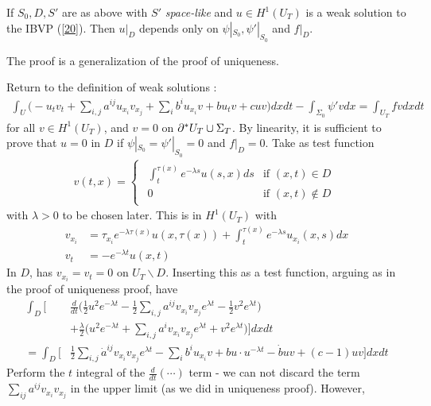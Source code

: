 \documentclass[12pt,a4paper]{report}
\newenvironment{proof}
{\begin{changemargin}{1cm}{0.5cm} 
	}%
	{\end{changemargin}
}
\begin{document}
\thm If $S_0, D, S'$ are as above with $S'$ \emph{space-like} and $u\in H^1(U_T)$ is a weak solution to the IBVP (\ref{20}). Then $u|_D$ depends only on $\psi|_{S_0}, \psi'|_{S_0}$ and $f|_D$. 
\begin{proof}
\pf The proof is a generalization of the proof of uniqueness.

\quad Return to the definition of weak solutions :
\begin{align*}
\int_U \Big(-u_t v_t + \sum_{i,j} a^{ij} u_{x_i} v_{x_j} + \sum_{i}b^i u_{x_i} v + bu_t v + cuv \Big) dxdt - \int_{\Sigma_0} \psi' v dx = \int_{U_T} fv dxdt
\end{align*}
for all $v\in H^1(U_T)$, and $v=0$ on $\partial^* U_T \cup \Sigma_T$. By linearity, it is sufficient to prove that $u=0$ in $D$ if $\psi|_{S_0} = \psi'|_{S_0}=0$ and $f|_D =0$. Take as test function
\begin{align*}
v(t,x) = \begin{cases}
\begin{array}{ll}
\int^{\tau(x)}_t e^{-\lambda s} u(s,x) ds & \text{if } (x,t) \in D \\
0 & \text{if } (x,t) \not\in D
\end{array}
\end{cases}
\end{align*}
with $\lambda >0$ to be chosen later. This is in $H^1(U_T)$ with
\begin{align*}
v_{x_i} &= \tau_{x_i} e^{-\lambda \tau(x)} u(x, \tau(x)) + \int_t^{\tau(x)} e^{-\lambda s} u_{x_i}(x,s) dx \\
v_t &= -e^{-\lambda t} u(x,t)
\end{align*}
In $D$, has $v_{x_i} = v_t =0$ on $U_T \backslash D$. Inserting this as a test function, arguing as in the proof of uniqueness proof, have
\begin{align*}
\int_D \Big[& \frac{d}{dt} \Big( \frac{1}{2}u^2 e^{-\lambda t} - \frac{1}{2} \sum_{i,j}a^{ij}v_{x_i}v_{x_j} e^{\lambda t} - \frac{1}{2} v^2 e^{\lambda t} \Big) \\
&+ \frac{\lambda}{2} \Big( u^2e^{-\lambda t} + \sum_{i,j}a^{i}v_{x_i}v_{x_j} e^{\lambda t} + v^2 e^{\lambda t} \Big) \Big] dxdt \\
= \int_D \Big[& \frac{1}{2} \sum_{i,j} \dot{a}^{ij}v_{x_i} v_{x_j} e^{\lambda t} - \sum_i b^i u_{x_i} v + bu\cdot u^{-\lambda t} - \dot{b}uv + (c-1) uv \Big] dxdt
\end{align*}
Perform the $t$ integral of the $\frac{d}{dt}(\cdots)$ term - we can not discard the term $\sum_{ij}a^{ij}v_{x_i} v_{x_j}$ in the upper limit (as we did in uniqueness proof). However,

\end{proof}
\end{document}
